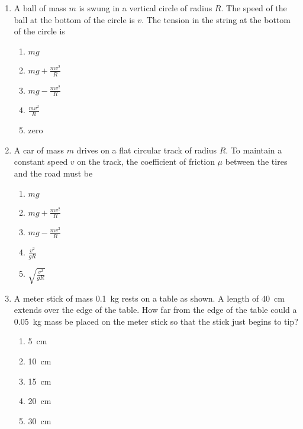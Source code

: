 \documentclass{../../oss-apphys}
\begin{document}
\begin{multicols}{2}
\begin{enumerate}[leftmargin=18pt]
  \item A ball of mass $m$ is swung in a vertical circle of radius $R$. The
    speed of the ball at the bottom of the circle is $v$. The tension in the
    string at the bottom of the circle is
    \begin{enumerate}[noitemsep,topsep=0pt,leftmargin=18pt,label=(\Alph*)]
    \item $\displaystyle mg$
    \item $\displaystyle mg+\frac{mv^2}{R}$
    \item $\displaystyle mg-\frac{mv^2}{R}$
    \item $\displaystyle \frac{mv^2}{R}$
    \item zero
    \end{enumerate}
    \columnbreak
    
  \item A car of mass $m$ drives on a flat circular track of radius $R$. To
    maintain a constant speed $v$ on the track, the coefficient of friction
    $\mu$ between the tires and the road must be
    \begin{enumerate}[noitemsep,topsep=0pt,leftmargin=18pt,label=(\Alph*)]
    \item $\displaystyle mg$
    \item $\displaystyle mg+\frac{mv^2}{R}$
    \item $\displaystyle mg-\frac{mv^2}{R}$
    \item $\displaystyle \frac{v^2}{gR}$
    \item $\displaystyle \sqrt{\frac{v^2}{gR}}$
    \end{enumerate}
    
  \item A meter stick of mass \SI{.1}{\kilo\gram} rests on a table as shown. A
    length of \SI{40}{\centi\metre} extends over the edge of the table. How far
    from the edge of the table could a \SI{.05}{\kilo\gram} mass be placed on
    the meter stick so that the stick just begins to tip?
    \begin{center}
      \vspace{-.2in}
    \end{center}
    \begin{enumerate}[noitemsep,topsep=0pt,leftmargin=18pt,label=(\Alph*)]
    \item\SI{5}{\centi\metre}
    \item\SI{10}{\centi\metre}
    \item\SI{15}{\centi\metre}
    \item\SI{20}{\centi\metre}
    \item\SI{30}{\centi\metre}
    \end{enumerate}
    \columnbreak
    

\end{enumerate}
\end{multicols}
\end{document}
